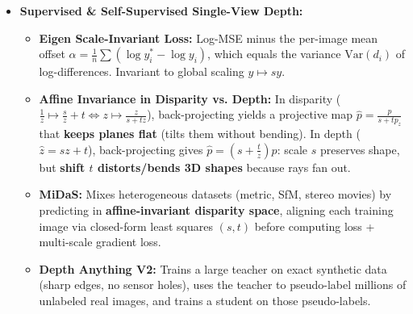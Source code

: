 \documentclass[11pt,a4paper]{article}
\theoremstyle{definition}
\theoremstyle{plain}
\theoremstyle{remark}
\begin{document}
\begin{itemize}
\begin{itemize}
        \item \textbf{Vanishing Points:} $\lambda v = K R d$ (depends only on rotation/pitch/roll, independent of translation).
        \item \textbf{Apparent Size:} $z = \frac{fH}{h}$ (requires knowing real object height $H$).
        \item \textbf{Vertical Ground Contact Position:} $z = \frac{fY}{y_s - y_h}$ (requires flat ground, camera height $Y$, and horizon row $y_h$; error grows as $z^2$).
        \item \textbf{What Networks Actually Use (Probes):}
        1) \emph{Pasted-Car Experiment:} Networks rely on \textbf{vertical image position} over apparent size.
        2) \emph{Pitch/Roll Crops:} Networks read raw pixel row rather than true distance to the horizon.
        3) \emph{Camera Focal Length Bias:} Networks memorize training focal length $f_0$, predicting $\hat{z} = \frac{f_0}{f}z$ on test camera $f$.
        4) \emph{Anamorphic Street Art:} Flat pavement painted like a hole fools single-image networks with zero uncertainty warning.
    \end{itemize}
    \item \textbf{Supervised \& Self-Supervised Single-View Depth:}
    \begin{itemize}
        \item \textbf{Eigen Scale-Invariant Loss:} Log-MSE minus the per-image mean offset $\alpha = \frac{1}{n}\sum (\log y_i^* - \log y_i)$, which equals the variance $\text{Var}(d_i)$ of log-differences. Invariant to global scaling $y \mapsto sy$.
        \item \textbf{Affine Invariance in Disparity vs. Depth:}
        In disparity ($\frac{1}{z} \mapsto \frac{s}{z} + t \iff z \mapsto \frac{z}{s+tz}$), back-projecting yields a projective map $\hat{p} = \frac{p}{s+tp_z}$ that \textbf{keeps planes flat} (tilts them without bending).
        In depth ($\hat{z} = sz+t$), back-projecting gives $\hat{p} = (s + \frac{t}{z})p$: scale $s$ preserves shape, but \textbf{shift $t$ distorts/bends 3D shapes} because rays fan out.
        \item \textbf{MiDaS:} Mixes heterogeneous datasets (metric, SfM, stereo movies) by predicting in \textbf{affine-invariant disparity space}, aligning each training image via closed-form least squares $(s,t)$ before computing loss + multi-scale gradient loss.
        \item \textbf{Depth Anything V2:} Trains a large teacher on exact synthetic data (sharp edges, no sensor holes), uses the teacher to pseudo-label millions of unlabeled real images, and trains a student on those pseudo-labels.

\end{itemize}
\end{itemize}
\end{document}
